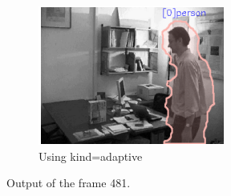 \documentclass{article}
\begin{document}
\begin{figure}
\begin{subfigure}{0.3\textwidth}
        \includegraphics[width=\linewidth,keepaspectratio]{out481_adaptive.PNG}
        \caption{Using kind=adaptive}
    \end{subfigure}
    \caption{Output of the frame 481.}
    \label{out481}
\end{figure}
\end{document}
